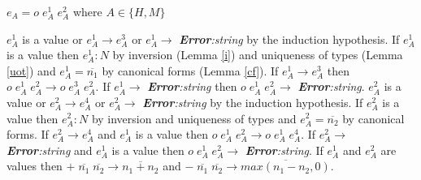 \begin{case}

$e_{A}=o\;e_{A}^{1}\;e_{A}^{2}$ where $A\in\lbrace H,M\rbrace$

$e_{A}^{1}$ is a value or $e_{A}^{1}\rightarrow e_{A}^{3}$ or $e_{A}^{1}\rightarrow$ \emph{\textbf{Error}:\;string} by the induction hypothesis.  If $e_{A}^{1}$ is a value then $e_{A}^{1}:N$ by inversion (Lemma \ref{i}) and uniqueness of types (Lemma \ref{uot}) and $e_{A}^{1}=\overline{n_{1}}$ by canonical forms (Lemma \ref{cf}).  If $e_{A}^{1}\rightarrow e_{A}^{3}$ then $o\;e_{A}^{1}\;e_{A}^{2}\rightarrow o\;e_{A}^{3}\;e_{A}^{2}$.  If $e_{A}^{1}\rightarrow$ \emph{\textbf{Error}:\;string} then $o\;e_{A}^{1}\;e_{A}^{2}\rightarrow$ \emph{\textbf{Error}:\;string}.  $e_{A}^{2}$ is a value or $e_{A}^{2}\rightarrow e_{A}^{4}$ or $e_{A}^{2}\rightarrow$ \emph{\textbf{Error}:\;string} by the induction hypothesis.  If $e_{A}^{2}$ is a value then $e_{A}^{2}:N$ by inversion and uniqueness of types and $e_{A}^{2}=\overline{n_{2}}$ by canonical forms.  If $e_{A}^{2}\rightarrow e_{A}^{4}$ and $e_{A}^{1}$ is a value then $o\;e_{A}^{1}\;e_{A}^{2}\rightarrow o\;e_{A}^{1}\;e_{A}^{4}$.  If $e_{A}^{2}\rightarrow$ \emph{\textbf{Error}:\;string} and $e_{A}^{1}$ is a value then $o\;e_{A}^{1}\;e_{A}^{2}\rightarrow$ \emph{\textbf{Error}:\;string}.  If $e_{A}^{1}$ and $e_{A}^{2}$ are values then $+\;\overline{n_{1}}\;\overline{n_{2}}\rightarrow\overline{n_{1}+n_{2}}$ and $-\;\overline{n_{1}}\;\overline{n_{2}}\rightarrow\overline{max(n_{1}-n_{2},0)}$.

\end{case}